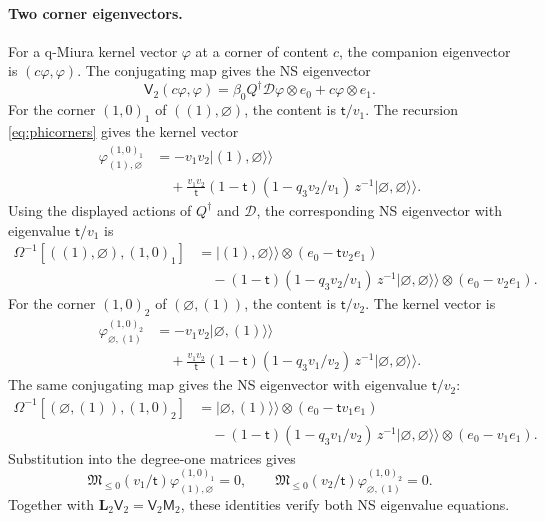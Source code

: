\documentclass[11pt]{amsart}
\theoremstyle{definition}
\theoremstyle{remark}
\newcommand{\Mt}{\mathsf t}                      %
\newcommand{\betaz}{\beta_0}                     %
\newcommand{\bx}[3]{(#1,#2)_{#3}}                %
\newcommand{\auxe}[1]{e_{#1}}                    %
\newcommand{\kket}[1]{\lvert #1\rangle\!\rangle} %
\newcommand{\pt}[2]{[#1,#2]}                     %
\newcommand{\Omap}{\Omega}                       %
\newcommand{\LL}{\mathbf L}
\newcommand{\Lax}[1]{\LL_{#1}}                   %
\newcommand{\DD}{\mathcal D}
\newcommand{\MM}{\mathsf M}
\newcommand{\Miura}[1]{\MM_{#1}}                 %
\newcommand{\VV}{\mathsf V}
\newcommand{\Vconj}[1]{\VV_{#1}}                 %
\newcommand{\Miuraop}{\mathfrak M}               %
\newcommand{\Miuraproj}{\Miuraop_{\leq0}}         %
\newcommand{\Meig}[2]{\varphi_{#1}^{#2}}         %
\newcommand{\Qan}{Q^\dagger}                     %
\begin{document}
\paragraph{Two corner eigenvectors.}
For a q-Miura kernel vector \(\varphi\) at a corner of content \(c\), the
companion eigenvector is \((c\varphi,\varphi)\). The conjugating map gives
the NS eigenvector
\[
 \Vconj{2}(c\varphi,\varphi)
 =\betaz\Qan\DD\varphi\otimes\auxe{0}
   +c\varphi\otimes\auxe{1}.
\]
For the corner \(\bx{1}{0}{1}\) of \(((1),\varnothing)\), the content is
\(\Mt/v_1\). The recursion \eqref{eq:phicorners} gives the kernel vector
\begin{align*}
 \Meig{(1),\varnothing}{\bx{1}{0}{1}}
 &=-v_1v_2\kket{(1),\varnothing}\\
 &\quad+\frac{v_1v_2}{\Mt}(1-\Mt)(1-q_3v_2/v_1)\,
          z^{-1}\kket{\varnothing,\varnothing}.
\end{align*}
Using the displayed actions of \(\Qan\) and \(\DD\), the corresponding
NS eigenvector with eigenvalue \(\Mt/v_1\) is
\begin{align*}
 \Omap^{-1}\pt{((1),\varnothing)}{\bx{1}{0}{1}}
 &=\kket{(1),\varnothing}\otimes(\auxe{0}-\Mt v_2\auxe{1})\\
 &\quad-(1-\Mt)(1-q_3v_2/v_1)\,z^{-1}\kket{\varnothing,\varnothing}
             \otimes(\auxe{0}-v_2\auxe{1}).
\end{align*}
For the corner \(\bx{1}{0}{2}\) of \((\varnothing,(1))\), the content is
\(\Mt/v_2\). The kernel vector is
\begin{align*}
 \Meig{\varnothing,(1)}{\bx{1}{0}{2}}
 &=-v_1v_2\kket{\varnothing,(1)}\\
 &\quad+\frac{v_1v_2}{\Mt}(1-\Mt)(1-q_3v_1/v_2)\,
          z^{-1}\kket{\varnothing,\varnothing}.
\end{align*}
The same conjugating map gives the NS eigenvector with eigenvalue \(\Mt/v_2\):
\begin{align*}
 \Omap^{-1}\pt{(\varnothing,(1))}{\bx{1}{0}{2}}
 &=\kket{\varnothing,(1)}\otimes(\auxe{0}-\Mt v_1\auxe{1})\\
 &\quad-(1-\Mt)(1-q_3v_1/v_2)\,z^{-1}\kket{\varnothing,\varnothing}
             \otimes(\auxe{0}-v_1\auxe{1}).
\end{align*}
Substitution into the degree-one matrices gives
\[
 \Miuraproj(v_1/\Mt)\Meig{(1),\varnothing}{\bx{1}{0}{1}}=0,
 \qquad
 \Miuraproj(v_2/\Mt)\Meig{\varnothing,(1)}{\bx{1}{0}{2}}=0.
\]
Together with \(\Lax{2}\Vconj{2}=\Vconj{2}\Miura{2}\), these identities
verify both NS eigenvalue equations.
\end{document}
